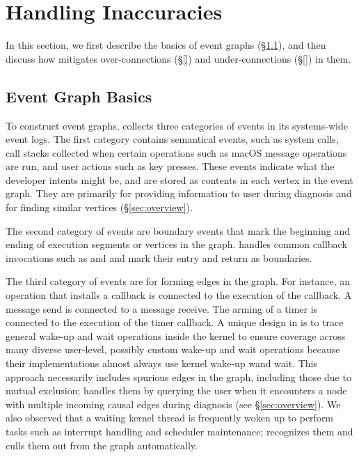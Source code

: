 \section{Handling Inaccuracies}\label{sec:graphcomputing}

In this section, we first describe the basics of \xxx event graphs
(\S\ref{subsec:eventgraph}), and then discuss how \xxx mitigates
over-connections (\S\ref{}) and under-connections (\S\ref{}) in them.

\subsection{Event Graph Basics}\label{subsec:eventgraph}

To construct event graphs, \xxx collects three categories of events in its
systems-wide event logs.  The first category contains semantical events,
such as system calls, call stacks collected when certain operations such
as macOS message operations are run, and user actions such as key presses.
These events indicate what the developer intents might be, and are stored
as contents in each vertex in the event graph.  They are primarily for
providing information to user during diagnosis and for finding similar
vertices (\S\ref{sec:overview}).

The second category of events are boundary events that mark the beginning
and ending of execution segments or vertices in the graph.  \xxx handles
common callback invocations such as  and
 and mark their entry and return as boundaries.

The third category of events are for forming edges in the graph.  For
instance, an operation that installs a callback is connected to the
execution of the callback.  A message send is connected to a message
receive.  The arming of a timer is connected to the execution of the timer
callback.  A unique design in \xxx is to trace general wake-up and wait
operations inside the kernel to ensure coverage across many diverse
user-level, possibly custom wake-up and wait operations because their
implementations almost always use kernel wake-up wand wait.  This approach
necessarily includes spurious edges in the graph, including those due to
mutual exclusion; \xxx handles them by querying the user when it
encounters a node with multiple incoming causal edges during diagnosis
(see \S\ref{sec:overview}).  We also observed that a waiting kernel thread
is frequently woken up to perform tasks such as interrupt handling and
scheduler maintenance; \xxx recognizes them and culls them out from the
graph automatically.


